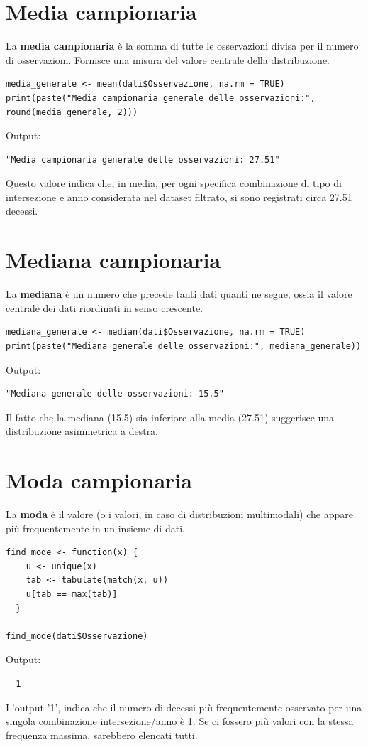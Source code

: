 \documentclass[14pt, openany, titlepage]{report} %
\begin{document}
\section{Media campionaria}
La \textbf{media campionaria} è la somma di tutte le osservazioni divisa per il numero di osservazioni.
 Fornisce una misura del valore centrale della distribuzione.
\begin{center}
\begin{lstlisting}[breaklines=true]
media_generale <- mean(dati$Osservazione, na.rm = TRUE)
print(paste("Media campionaria generale delle osservazioni:", round(media_generale, 2)))
\end{lstlisting}  
\end{center}
\noindent
Output: 
\begin{verbatim}
"Media campionaria generale delle osservazioni: 27.51"
\end{verbatim}
Questo valore indica che, in media, per ogni specifica combinazione di tipo di intersezione e anno considerata nel dataset filtrato, si sono registrati circa 27.51 decessi.

\section{Mediana campionaria}
La \textbf{mediana} è un numero che precede tanti dati quanti ne segue, ossia il 
valore centrale dei dati riordinati in senso crescente.
\begin{center}
\begin{lstlisting}[breaklines=true]
mediana_generale <- median(dati$Osservazione, na.rm = TRUE)
print(paste("Mediana generale delle osservazioni:", mediana_generale))
\end{lstlisting}  
\end{center}
\noindent
Output:
\begin{verbatim}
"Mediana generale delle osservazioni: 15.5"
\end{verbatim}
 Il fatto che la mediana (15.5)
 sia inferiore alla media (27.51) suggerisce una distribuzione 
 asimmetrica a destra.

\section{Moda campionaria}
La \textbf{moda} è il valore (o i valori, in caso di distribuzioni multimodali)
 che appare più frequentemente in un insieme di dati.
\begin{center}
\begin{lstlisting}[breaklines=true]
find_mode <- function(x) {
    u <- unique(x)
    tab <- tabulate(match(x, u))
    u[tab == max(tab)]
  }

find_mode(dati$Osservazione)
\end{lstlisting}  
\end{center}
\noindent
Output:
\begin{verbatim}
  1 
\end{verbatim}
L'output '1', indica che il numero di decessi 
più frequentemente osservato per una singola combinazione 
intersezione/anno è 1. Se ci fossero più valori con la stessa 
frequenza massima, sarebbero elencati tutti.
\end{document}
